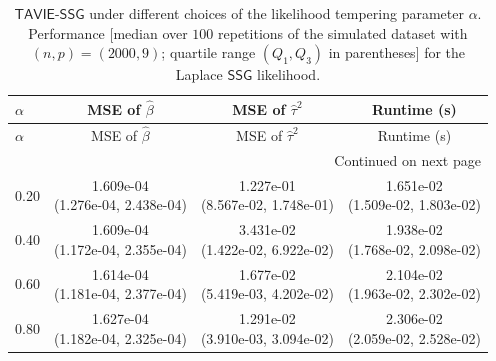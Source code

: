 \documentclass[12pt]{article}
\numberwithin{equation}{section}
\newcommand{\ssg}{\mathsf{SSG}}
\newcommand{\tssg}{\mathsf{TAVIE}\text{-}\mathsf{SSG}}
\begin{document}
{\scriptsize
\setlength{\tabcolsep}{6pt} %
\renewcommand{\arraystretch}{1.15}%
\begin{longtable}{lccc}
\caption{\footnotesize{$\tssg$ under different choices of the likelihood tempering parameter $\alpha$. Performance [median over $100$ repetitions of the simulated dataset with $(n, p) = (2000, 9)$; quartile range $(Q_1, Q_3)$ in parentheses] for the Laplace $\ssg$ likelihood.}} \label{tab:Laplace-different-alpha}\\
\toprule
\toprule
$\alpha$ & MSE of $\widehat{\beta}$ & MSE of $\widehat{\tau}^{2}$ & Runtime (s) \\
\midrule
\endfirsthead

\toprule
$\alpha$ & MSE of $\widehat{\beta}$ & MSE of $\widehat{\tau}^{2}$ & Runtime (s) \\
\midrule
\endhead

\midrule
\multicolumn{4}{r}{Continued on next page} \\
\midrule
\endfoot

\bottomrule
\bottomrule
\endlastfoot

0.20 &
  \makecell[c]{1.609e-04\\(1.276e-04, 2.438e-04)} &
  \makecell[c]{1.227e-01\\(8.567e-02, 1.748e-01)} &
  \makecell[c]{1.651e-02\\(1.509e-02, 1.803e-02)} \\

0.40 &
  \makecell[c]{1.609e-04\\(1.172e-04, 2.355e-04)} &
  \makecell[c]{3.431e-02\\(1.422e-02, 6.922e-02)} &
  \makecell[c]{1.938e-02\\(1.768e-02, 2.098e-02)} \\

0.60 &
  \makecell[c]{1.614e-04\\(1.181e-04, 2.377e-04)} &
  \makecell[c]{1.677e-02\\(5.419e-03, 4.202e-02)} &
  \makecell[c]{2.104e-02\\(1.963e-02, 2.302e-02)} \\

0.80 &
  \makecell[c]{1.627e-04\\(1.182e-04, 2.325e-04)} &
  \makecell[c]{1.291e-02\\(3.910e-03, 3.094e-02)} &
  \makecell[c]{2.306e-02\\(2.059e-02, 2.528e-02)} \\


\end{longtable}}
\end{document}

